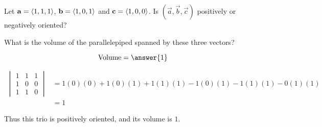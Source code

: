 \documentclass{ximera}
\begin{document}
\begin{question}
  Let $\mathbf{a} = \left\langle 1,1,1\right\rangle$, $\mathbf{b} = \left\langle 1,0,1\right\rangle$ and
  $\mathbf{c} = \left\langle 1,0,0\right\rangle$.  Is $(\vec{a},\vec{b},\vec{c})$
  positively or negatively oriented?
  \begin{multipleChoice}
  \end{multipleChoice}
		
  What is the volume of the parallelepiped spanned by these three vectors?
  
  \[
  \textrm{Volume} = \answer{1}
  \]
  
  \begin{hint}
    \begin{align*}
      \begin{vmatrix}
	1 & 1 & 1\\
	1 & 0 & 0\\
	1 & 1 & 0
      \end{vmatrix} &=
      1(0)(0)+1(0)(1)+1(1)(1)-1(0)(1)-1(1)(1)-0(1)(1)\\
      &=1
    \end{align*}
    
    Thus this trio is positively oriented, and its volume is $1$.
  \end{hint}
\end{question}
\end{document}
